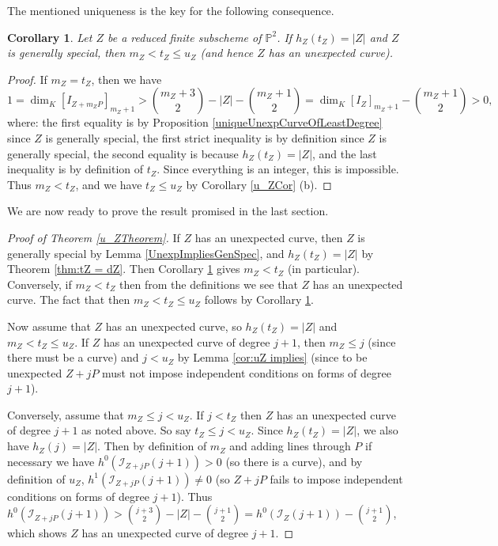 \documentclass[12pt]{amsart}
\numberwithin{equation}{section}
\newtheorem{corollary}[theorem]{Corollary}
\theoremstyle{definition}
\begin{document}
The mentioned uniqueness is the key for the following consequence. 

\begin{corollary}\label{u_ZCorB}
Let $Z$ be a reduced finite subscheme of ${ \ensuremath{\mathbb{P}}}^2$. 
If $h_Z(t_Z)=|Z|$ and $Z$ is generally special, then $m_Z<t_Z\leq u_Z$ (and hence $Z$ has an unexpected curve).
\end{corollary}

\begin{proof}
If $m_Z=t_Z$, then we have
\[
1=\dim_K [I_{Z+m_ZP}]_{m_Z+1}>\binom{m_Z+3}{2}-|Z|-\binom{m_Z+1}{2}=\dim_K [I_Z]_{m_Z+1}-\binom{m_Z+1}{2}>0,
\]
where: the first equality is by Proposition \ref{uniqueUnexpCurveOfLeastDegree}
since $Z$ is generally special, the first strict inequality is by definition since $Z$ is generally special,
the second equality is because $h_Z(t_Z)=|Z|$, and the last inequality is by definition of $t_Z$.
Since everything is an integer, this is impossible. Thus $m_Z<t_Z$, and we have $t_Z\leq u_Z$ by Corollary \ref{u_ZCor} (b).
\end{proof}

We are now ready to prove the result promised in the last section.

\begin{proof}[Proof of Theorem \ref{u_ZTheorem}] \label{pf of uzthm}
If $Z$ has an unexpected curve, then $Z$ is generally special by 
Lemma \ref{UnexpImpliesGenSpec},
and $h_Z(t_Z)=|Z|$ by Theorem \ref{thm:tZ = dZ}. Then Corollary \ref{u_ZCorB} gives $m_Z < t_Z$ (in particular).
Conversely, if $m_Z < t_Z$ then from the definitions we see that $Z$ has an unexpected curve. 
The fact that then $m_Z<t_Z\leq u_Z$ follows by Corollary \ref{u_ZCorB}.

Now assume that $Z$ has an unexpected curve, so
$h_Z(t_Z)=|Z|$ and $m_Z<t_Z\leq u_Z$. If $Z$ has an unexpected curve of degree $j+1$, then
$m_Z\leq j$ (since there must be a curve) and
$j < u_Z$ by Lemma \ref{cor:uZ implies} (since to be unexpected $Z+jP$ must not impose 
independent conditions on forms of degree $j+1$).

Conversely, assume that $m_Z \leq j < u_Z$. 
If $j<t_Z$ then  $Z$ has an 
unexpected curve of degree $j+1$ as noted above. So say $t_Z\leq j<u_Z$. Since $h_Z(t_Z) = |Z|$, we also have $h_Z(j)=|Z|$.
Then by definition of $m_Z$ and adding lines through $P$
if necessary we have $h^0(\mathcal I_{Z+jP}(j+1)) > 0$ (so there is a curve),
and by definition of $u_Z$, $h^1(\mathcal I_{Z+jP}(j+1)) \neq 0$ 
(so $Z+jP$ fails to impose independent conditions on forms of degree $j+1$).
Thus $h^0(\mathcal I_{Z+jP}(j+1)) > \binom{j+3}{2}-|Z|-\binom{j+1}{2}=
h^0(\mathcal I_{Z}(j+1)) -\binom{j+1}{2}$, which shows $Z$ has an 
unexpected curve of degree $j+1$.
\end{proof}
\end{document}
